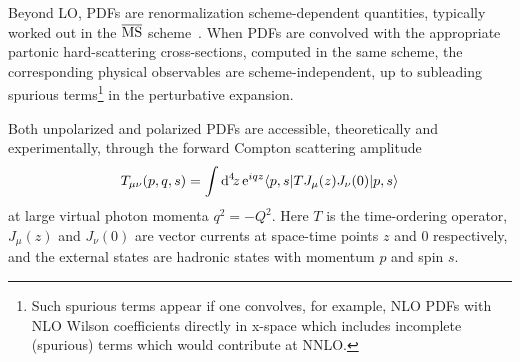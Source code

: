 Beyond LO, PDFs are renormalization scheme-dependent 
quantities, typically worked out in the $\overline{\rm MS}$ 
scheme~\cite{tHooft:1973mfk,Weinberg:1951ss}.
%
When PDFs are convolved with the appropriate partonic hard-scattering 
cross-sections, computed in the same scheme, the corresponding physical 
observables are scheme-independent, up to subleading spurious 
terms\footnote{Such spurious terms appear if one convolves, for example, 
 NLO PDFs with NLO Wilson coefficients directly in x-space which includes 
 incomplete (spurious) terms which would contribute at NNLO.} in the 
perturbative expansion. 

Both unpolarized and polarized PDFs are accessible, theoretically and 
experimentally, through the forward Compton scattering amplitude
\begin{equation}
\label{eq:Compton}
T_{\mu\nu}(p,q,s) 
= 
\int {\rm d}^4\!z\, {\rm e}^{iqz}  \langle p,s |T J_\mu(z) J_\nu(0)|p,s\rangle
\end{equation}
at large virtual photon momenta $q^2=-Q^2$. 
%
Here $T$ is the time-ordering operator, $J_\mu(z)$ and $J_\nu(0)$ are vector
currents at space-time points $z$ and $0$ respectively, and the 
external states are hadronic states with momentum $p$ and spin $s$.

